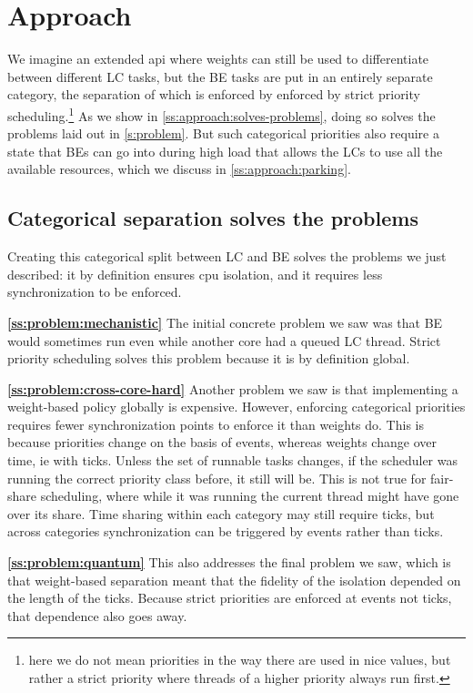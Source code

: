 \section{Approach}\label{s:approach}

We imagine an extended \cgroups{} api where weights can still be used to
differentiate between different LC tasks, but the BE tasks are put in an
entirely separate category, the separation of which is enforced by enforced by
strict priority scheduling.\footnote{here we do not mean priorities in the way
there are used in nice values, but rather a strict priority where threads of a
higher priority always run first.} As we show in
\autoref{ss:approach:solves-problems}, doing so solves the problems laid out in
\autoref{s:problem}. But such categorical priorities also require a state that
BEs can go into during high load that allows the LCs to use all the available
resources, which we discuss in \autoref{ss:approach:parking}.

\subsection{Categorical separation solves the
problems}\label{ss:approach:solves-problems}

Creating this categorical split between LC and BE  solves the problems we just
described: it by definition ensures cpu isolation, and it requires less
synchronization to be enforced.

\textbf{\autoref{ss:problem:mechanistic}} The initial concrete problem we saw
was that BE would sometimes run even while another core had a queued LC thread.
Strict priority scheduling solves this problem because it is by definition
global.

\textbf{\autoref{ss:problem:cross-core-hard}} Another problem we saw is that
implementing a weight-based policy globally is expensive. However, enforcing
categorical priorities requires fewer synchronization points to enforce it than
weights do. This is because priorities change on the basis of events, whereas
weights change over time, ie with ticks. Unless the set of runnable tasks
changes, if the scheduler was running the correct priority class before, it
still will be. This is not true for fair-share scheduling, where while it was
running the current thread might have gone over its share. Time sharing within
each category may still require ticks, but across categories synchronization can
be triggered by events rather than ticks.

\textbf{\autoref{ss:problem:quantum}} This also addresses the final problem we
saw, which is that weight-based separation meant that the fidelity of the
isolation depended on the length of the ticks. Because strict priorities are
enforced at events not ticks, that dependence also goes away.

